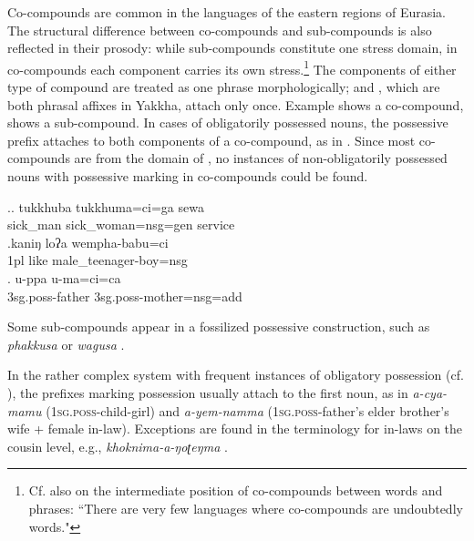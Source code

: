 Co-compounds are common in the languages of the eastern regions of Eurasia. The structural difference between co-compounds and sub-compounds is also reflected in their prosody: while sub-compounds constitute one stress domain, in co-compounds each component carries its own stress.\footnote{Cf. also \citet[3]{Waelchli2005_Co-compounds} on the intermediate position of co-compounds between words and phrases: “There are very few languages where co-compounds are undoubtedly words."} The components of either type of compound are treated as one phrase morphologically;  and , which are both phrasal affixes in Yakkha, attach only once. Example \Next[a] shows a co-compound, \Next[b] shows a sub-compound.  In cases of obligatorily possessed nouns, the possessive prefix attaches to both components of a co-compound, as in \Next[c]. Since most co-compounds are from the domain of , no instances of non-obligatorily possessed nouns with possessive marking in co-compounds  could be found. 


 \ex.\ag. tukkhuba tukkhuma=ci=ga   sewa\\ 
sick\_man sick\_woman{\sc =nsg=gen} service\\
 \bg.kaniŋ loʔa wempha-babu=ci\\
 {\sc 1pl} like male\_teenager-boy{\sc =nsg}\\
  
\bg.  u-ppa u-ma=ci=ca\\
{\sc 3sg.poss-}father {\sc 3sg.poss-}mother{\sc =nsg=add}\\
 

Some sub-compounds appear in a fossilized possessive construction, such as \emph{phak\-kusa}  or \emph{wagusa} .

 In the rather complex  system with frequent instances of obligatory possession (cf. ), the prefixes marking possession usually attach to the first noun, as in  \emph{a-cya-mamu}  (\textsc{1sg.poss}-child-girl) and  \emph{a-yem-namma}  (\textsc{1sg.poss}-father's elder brother's wife + female in-law). Exceptions are found in the terminology for in-laws on the cousin level, e.g., \emph{khoknima-a-ŋoʈeŋma} .
 
